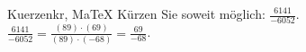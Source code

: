 \begin{MAufgabe}{Kuerzen}{kr, MaTeX}
K\"urzen Sie soweit m\"oglich: $\frac{6141}{-6052}$.\\ 
\ifLsg\MLoesung
\quad $\frac{6141}{-6052}=\frac{(89)\cdot(69)}{(89)\cdot(-68)}=\frac{69}{-68}$.\else\relax\fi
 \end{MAufgabe}